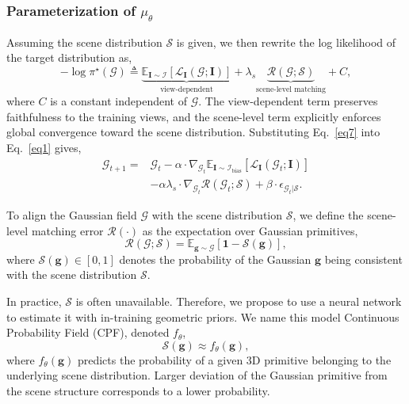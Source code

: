 \documentclass[lettersize,journal]{IEEEtran}
\begin{document}
\subsubsection{Parameterization of $\mu_{\theta}$}

Assuming the scene distribution $\mathcal{S}$ is given, we then rewrite the log likelihood of the target distribution as, 
\begin{equation}
    -\log \pi^{\star} (\mathcal{G}) \triangleq \underbrace{\mathbb{E}_{\mathbf{I}\sim\mathcal{I}}\!\left[\mathcal{L}_{\mathbf{I}}(\mathcal{G};\mathbf{I})\right]}_{\text{view-dependent}}
    + \lambda_{s} \underbrace{\mathcal{R}(\mathcal{G};\mathcal{S})}_{\text{scene-level matching}} + C,
    \label{eq7}
\end{equation}
where $C$ is a constant independent of $\mathcal{G}$. The view-dependent term preserves faithfulness to the training views, and the scene-level term explicitly enforces global convergence toward the scene distribution. Substituting Eq.~\ref{eq7} into Eq.~\ref{eq1} gives, 
\begin{equation}
    \begin{aligned}
    \mathcal{G}_{t+1} = &\mathcal{G}_t - \alpha \cdot \nabla_{\mathcal{G}_t} \mathbb{E}_{\mathbf{I}\sim\mathcal{I}_{\text{bias}}}\!\left[\mathcal{L}_{\mathbf{I}}(\mathcal{G}_t;\mathbf{I})\right] \\
    &- \alpha \lambda_s \cdot \nabla_{\mathcal{G}_t} \mathcal{R}(\mathcal{G}_t;\mathcal{S}) + \beta \cdot \epsilon_{\mathcal{G}_t \vert \mathcal{S}}.
    \end{aligned}
    \label{eq8}
\end{equation} 

To align the Gaussian field $\mathcal{G}$ with the scene distribution $\mathcal{S}$, we define the scene-level matching error $\mathcal{R}(\cdot)$ as the expectation over Gaussian primitives, 
\begin{equation}
    \mathcal{R}(\mathcal{G};\mathcal{S}) = \mathbb{E}_{\mathbf{g} \sim \mathcal{G}} \left[ \mathbf{1} - \mathcal{S} (\mathbf{g}) \right],
    \label{eq9}
\end{equation}
where $\mathcal{S} (\mathbf{g}) \in [0, 1]$ denotes the probability of the Gaussian $\mathbf{g}$ being consistent with the scene distribution $\mathcal{S}$.

In practice, $\mathcal{S}$ is often unavailable. Therefore, we propose to use a neural network to estimate it with in-training geometric priors. We name this model Continuous Probability Field (CPF), denoted $f_{\theta}$, 
\begin{equation}
    \mathcal{S}(\mathbf{g}) \approx f_{\theta}(\mathbf{g}), 
    \label{eq10}
\end{equation}
where $f_{\theta}(\mathbf{g})$ predicts the probability of a given 3D primitive belonging to the underlying scene distribution. 
Larger deviation of the Gaussian primitive from the scene structure corresponds to a lower probability.
\end{document}
